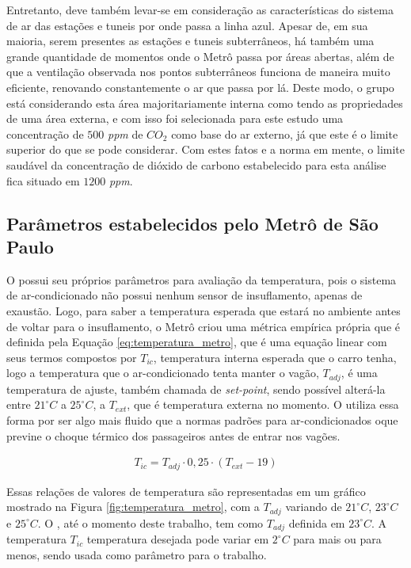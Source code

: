 \documentclass[acronym,symbols,table]{fei}
\begin{document}
Entretanto, deve também levar-se em consideração as características do sistema de ar das estações e tuneis por onde passa a linha azul. Apesar de, em sua maioria, serem presentes as estações e tuneis subterrâneos, há também uma grande quantidade de momentos onde o Metrô passa por áreas abertas, além de que a ventilação observada nos pontos subterrâneos funciona de maneira muito eficiente, renovando constantemente o ar que passa por lá. Deste modo, o grupo está considerando esta área majoritariamente interna como  tendo as propriedades de uma área externa, e com isso foi selecionada para este estudo uma concentração de $500$ \textit{ppm} de ${CO}_{2}$ como base do ar externo, já que este é o limite superior do que se pode considerar. Com estes fatos e a norma em mente, o limite saudável da concentração de dióxido de carbono estabelecido para esta análise fica situado em $1200$ \textit{ppm}.

\subsection{Parâmetros estabelecidos pelo Metrô de São Paulo}

O \textcite{metrosp2024} possui seu próprios parâmetros para avaliação da temperatura, pois o sistema de ar-condicionado não possui nenhum sensor de insuflamento, apenas de exaustão. Logo, para saber a temperatura esperada que estará no ambiente antes de voltar para o insuflamento, o Metrô criou uma métrica empírica própria que é definida pela Equação \ref{eq:temperatura_metro}, que é uma equação linear com seus termos compostos por $T_{ic}$, temperatura interna esperada que o carro tenha, logo a temperatura que o ar-condicionado tenta manter o vagão, $T_{adj}$, é uma temperatura de ajuste, também chamada de \textit{set-point}, sendo possível alterá-la entre ${21}^\circ C$ a ${25}^\circ C$, a $T_{ext}$, que é temperatura externa no momento. O \textcite{metrosp2024} utiliza essa forma por ser algo mais fluido que a normas padrões para ar-condicionados oque previne o choque térmico dos passageiros antes de entrar nos vagões.

\begin{equation} \label{eq:temperatura_metro}
\begin{aligned}
{T}_{ic} = {T}_{adj} \cdot {0,25} \cdot ({T}_{ext} - {19})
\end{aligned}
\end{equation}

Essas relações de valores de temperatura são representadas em um gráfico mostrado na Figura \ref{fig:temperatura_metro}, com a $T_{adj}$ variando de ${21}^\circ C$, ${23}^\circ C$ e ${25}^\circ C$. O \textcite{metrosp2024}, até o momento deste trabalho, tem como $T_{adj}$ definida em  ${23}^\circ C$. A temperatura $T_{ic}$ temperatura desejada pode variar em ${2}^\circ C$ para mais ou para menos, sendo usada como parâmetro para o trabalho.
\end{document}

